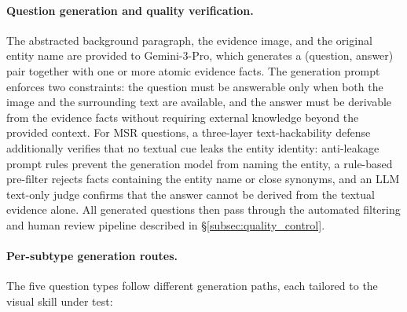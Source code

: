 \documentclass{llmxive}
\begin{document}
\paragraph{Question generation and quality verification.}
The abstracted background paragraph, the evidence image, and the original entity name are provided to Gemini-3-Pro, which generates a (question, answer) pair together with one or more atomic evidence facts. The generation prompt enforces two constraints: the question must be answerable only when both the image and the surrounding text are available, and the answer must be derivable from the evidence facts without requiring external knowledge beyond the provided context. For MSR questions, a three-layer text-hackability defense additionally verifies that no textual cue leaks the entity identity: anti-leakage prompt rules prevent the generation model from naming the entity, a rule-based pre-filter rejects facts containing the entity name or close synonyms, and an LLM text-only judge confirms that the answer cannot be derived from the textual evidence alone. All generated questions then pass through the automated filtering and human review pipeline described in \S\ref{subsec:quality_control}.

\paragraph{Per-subtype generation routes.}
The five question types follow different generation paths, each tailored to the visual skill under test:
\end{document}
